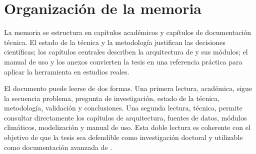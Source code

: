 \section{Organización de la memoria}

La memoria se estructura en capítulos académicos y capítulos de documentación técnica. El estado de la técnica y la metodología justifican las decisiones científicas; los capítulos centrales describen la arquitectura de \hydra y sus módulos; el manual de uso y los anexos convierten la tesis en una referencia práctica para aplicar la herramienta en estudios reales.

El documento puede leerse de dos formas. Una primera lectura, académica, sigue la secuencia problema, pregunta de investigación, estado de la técnica, metodología, validación y conclusiones. Una segunda lectura, técnica, permite consultar directamente los capítulos de arquitectura, fuentes de datos, módulos climáticos, modelización y manual de uso. Esta doble lectura es coherente con el objetivo de que la tesis sea defendible como investigación doctoral y utilizable como documentación avanzada de \hydra.
